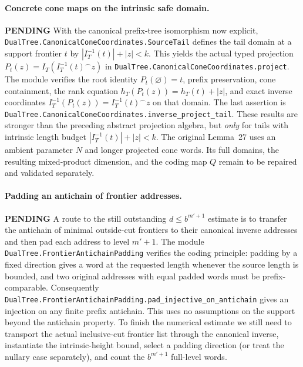 \documentclass[11pt]{article}
\newcommand{\todo}{\textcolor{gray!70!black}{\textbf{PENDING}}}
\newcommand{\lean}[1]{\texttt{#1}}
\begin{document}
\paragraph{Concrete cone maps on the intrinsic safe domain.} \todo
With the canonical prefix-tree isomorphism now explicit,
\lean{DualTree.CanonicalConeCoordinates.SourceTail} defines the
tail domain at a support frontier $t$ by
$|I_T^{-1}(t)|+|z|<k$.  This yields the actual typed projection
$P_t(z)=I_T(I_T^{-1}(t)^\frown z)$ in
\lean{DualTree.CanonicalConeCoordinates.project}.
The module verifies the root identity $P_t(\varnothing)=t$,
prefix preservation, cone containment, the rank equation
$h_T(P_t(z))=h_T(t)+|z|$, and exact inverse coordinates
$I_T^{-1}(P_t(z))=I_T^{-1}(t)^\frown z$ on that domain.
The last assertion is
\lean{DualTree.CanonicalConeCoordinates.inverse_project_tail}.
These results are stronger than the preceding abstract projection
algebra, but \emph{only} for tails with intrinsic length budget
$|I_T^{-1}(t)|+|z|<k$.  The original Lemma~27 uses an ambient
parameter $N$ and longer projected cone words. Its full domains,
the resulting mixed-product dimension, and the coding map $Q$
remain to be repaired and validated separately.


\paragraph{Padding an antichain of frontier addresses.} \todo
A route to the still outstanding $d\le b^{m'+1}$ estimate is to
transfer the antichain of minimal outside-cut frontiers to their
canonical inverse addresses and then pad each address to level
$m'+1$.  The module \lean{DualTree.FrontierAntichainPadding}
verifies the coding principle: padding by a fixed direction gives
a word at the requested length whenever the source length is
bounded, and two original addresses with equal padded words
must be prefix-comparable.  Consequently
\lean{DualTree.FrontierAntichainPadding.pad_injective_on_antichain}
gives an injection on any finite prefix antichain.  This uses
no assumptions on the support beyond the antichain property.
To finish the numerical estimate we still need to transport the
actual inclusive-cut frontier list through the canonical inverse,
instantiate the intrinsic-height bound, select a padding direction
(or treat the nullary case separately), and count the
$b^{m'+1}$ full-level words.
\end{document}

